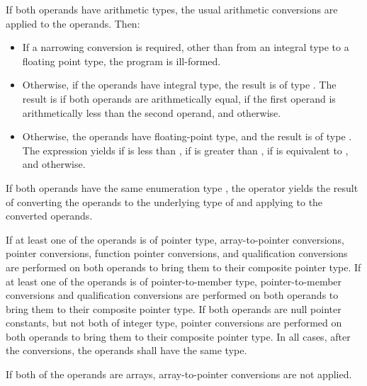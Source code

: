 \pnum
If both operands have arithmetic types,
the usual arithmetic conversions are applied to the operands.
Then:

\begin{itemize}
\item
If a narrowing conversion is required,
other than from an integral type to a floating point type,
the program is ill-formed.

\item
Otherwise, if the operands have integral type,
the result is of type .
The result is
if both operands are arithmetically equal,
if the first operand is arithmetically
less than the second operand,
and
otherwise.
\item
Otherwise, the operands have floating-point type, and
the result is of type .
The expression  yields
if  is less than ,
if  is greater than ,
if  is equivalent to ,
and
 otherwise.
\end{itemize}

\pnum
If both operands have the same enumeration type ,
the operator yields the result of
converting the operands to the underlying type of 
and applying \tcode{<=>} to the converted operands.

\pnum
If at least one of the operands is of pointer type,
array-to-pointer conversions,
pointer conversions,
function pointer conversions,
and
qualification conversions
are performed on both operands
to bring them to their composite pointer type.
%
If at least one of the operands is of pointer-to-member type,
pointer-to-member conversions
and
qualification conversions
are performed on both operands
to bring them to their composite pointer type.
%
If both operands are null pointer constants,
but not both of integer type,
pointer conversions
are performed on both operands
to bring them to their composite pointer type.
%
In all cases, after the conversions, the operands shall have the same type.
\begin{note}
If both of the operands are arrays,
array-to-pointer conversions are not applied.
\end{note}

